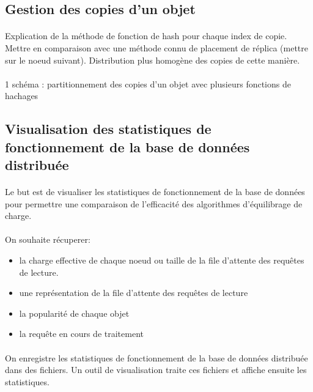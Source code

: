 \documentclass[12pt]{article}
\begin{document}
\subsection{Gestion des copies d'un objet}
\paragraph{} Explication de la méthode de fonction de hash pour chaque index de copie. Mettre en comparaison avec une méthode connu de placement de réplica (mettre sur le noeud suivant). Distribution plus homogène des copies de cette manière.

\paragraph{} 1 schéma : partitionnement des copies d'un objet avec plusieurs fonctions de hachages

\subsection{Visualisation des statistiques de fonctionnement de la base de données distribuée}

\paragraph{} Le but est de visualiser les statistiques de fonctionnement de la base de données pour permettre une comparaison de l'efficacité des algorithmes d'équilibrage de charge.

\paragraph{} On souhaite récuperer:
\begin{itemize}
 \item la charge effective de chaque noeud ou taille de la file d'attente des requêtes de lecture.
 \item une représentation de la file d'attente des requêtes de lecture
 \item la popularité de chaque objet
 \item la requête en cours de traitement
\end{itemize}

\paragraph{} On enregistre les statistiques de fonctionnement de la base de données distribuée dans des fichiers. Un outil de visualisation traite ces fichiers et affiche ensuite les statistiques.
\end{document}
